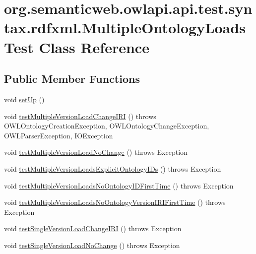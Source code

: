 \hypertarget{classorg_1_1semanticweb_1_1owlapi_1_1api_1_1test_1_1syntax_1_1rdfxml_1_1_multiple_ontology_loads_test}{\section{org.\-semanticweb.\-owlapi.\-api.\-test.\-syntax.\-rdfxml.\-Multiple\-Ontology\-Loads\-Test Class Reference}
\label{classorg_1_1semanticweb_1_1owlapi_1_1api_1_1test_1_1syntax_1_1rdfxml_1_1_multiple_ontology_loads_test}
}
\subsection*{Public Member Functions}
\begin{DoxyCompactItemize}
\item 
void \hyperlink{classorg_1_1semanticweb_1_1owlapi_1_1api_1_1test_1_1syntax_1_1rdfxml_1_1_multiple_ontology_loads_test_ada07c998149f655da06cb420e79fd767}{set\-Up} ()
\item 
void \hyperlink{classorg_1_1semanticweb_1_1owlapi_1_1api_1_1test_1_1syntax_1_1rdfxml_1_1_multiple_ontology_loads_test_a957196ec5ae9853a9d19320d6b35259e}{test\-Multiple\-Version\-Load\-Change\-I\-R\-I} ()  throws O\-W\-L\-Ontology\-Creation\-Exception,             O\-W\-L\-Ontology\-Change\-Exception, O\-W\-L\-Parser\-Exception, I\-O\-Exception 
\item 
void \hyperlink{classorg_1_1semanticweb_1_1owlapi_1_1api_1_1test_1_1syntax_1_1rdfxml_1_1_multiple_ontology_loads_test_aac19abfa0bcb566884e3c62e19178b14}{test\-Multiple\-Version\-Load\-No\-Change} ()  throws Exception 
\item 
void \hyperlink{classorg_1_1semanticweb_1_1owlapi_1_1api_1_1test_1_1syntax_1_1rdfxml_1_1_multiple_ontology_loads_test_a0eee4fefc32a3f08d9e88ea6a9e6c5af}{test\-Multiple\-Version\-Loads\-Explicit\-Ontology\-I\-Ds} ()  throws Exception 
\item 
void \hyperlink{classorg_1_1semanticweb_1_1owlapi_1_1api_1_1test_1_1syntax_1_1rdfxml_1_1_multiple_ontology_loads_test_a64816df21b0b3eb4d75734a8781cf2dc}{test\-Multiple\-Version\-Loads\-No\-Ontology\-I\-D\-First\-Time} ()  throws Exception 
\item 
void \hyperlink{classorg_1_1semanticweb_1_1owlapi_1_1api_1_1test_1_1syntax_1_1rdfxml_1_1_multiple_ontology_loads_test_a7d41b4a4ffb2f44041c4edd69409042b}{test\-Multiple\-Version\-Loads\-No\-Ontology\-Version\-I\-R\-I\-First\-Time} ()  throws Exception 
\item 
void \hyperlink{classorg_1_1semanticweb_1_1owlapi_1_1api_1_1test_1_1syntax_1_1rdfxml_1_1_multiple_ontology_loads_test_aa4c567b84cb88eccb23f2072d53e8eea}{test\-Single\-Version\-Load\-Change\-I\-R\-I} ()  throws Exception 
\item 
void \hyperlink{classorg_1_1semanticweb_1_1owlapi_1_1api_1_1test_1_1syntax_1_1rdfxml_1_1_multiple_ontology_loads_test_a10ce1eb7bc9cd7deb3d9c07ef4e7072d}{test\-Single\-Version\-Load\-No\-Change} ()  throws Exception 
\end{DoxyCompactItemize}

